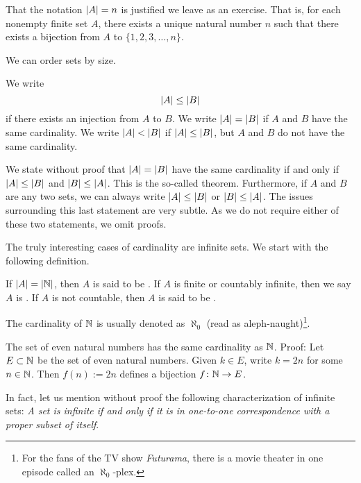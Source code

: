 That the notation $\left\lvert {A} \right\rvert = n$ is justified we leave as an exercise.  That
is, for each nonempty finite set $A$, there exists a unique natural number
$n$ such that there exists a bijection from $A$ to $\{ 1,2,3,\ldots,n \}$.


We can order sets by size.

\begin{defn} \label{def:comparecards}
We write
\begin{equation*}
\left\lvert {A} \right\rvert \leq \left\lvert {B} \right\rvert
\end{equation*}
if there exists an injection from $A$ to $B$.  We write $\left\lvert {A} \right\rvert = \left\lvert {B} \right\rvert$
if $A$ and $B$ have the same cardinality.  We write $\left\lvert {A} \right\rvert < \left\lvert {B} \right\rvert$
if $\left\lvert {A} \right\rvert \leq \left\lvert {B} \right\rvert$, but $A$ and $B$ do not have the same cardinality.
\end{defn}

We state without proof that
$\left\lvert {A} \right\rvert = \left\lvert {B} \right\rvert$ have the same cardinality if and only if
$\left\lvert {A} \right\rvert \leq \left\lvert {B} \right\rvert$ and
$\left\lvert {B} \right\rvert \leq \left\lvert {A} \right\rvert$.  This is the so-called
 theorem.
Furthermore, if $A$ and $B$ are any two sets,
we can always write $\left\lvert {A} \right\rvert \leq \left\lvert {B} \right\rvert$ or
$\left\lvert {B} \right\rvert \leq \left\lvert {A} \right\rvert$.  The issues surrounding this
last statement are very subtle.  As we do not require either
of these two statements, we omit proofs.

The truly interesting cases of cardinality are infinite sets.  We start with the following
definition.

\begin{defn}
If $\left\lvert {A} \right\rvert = \left\lvert {{\mathbb{N}}} \right\rvert$, then $A$ is said to be
\emph{}.
If $A$ is finite or countably infinite, then we say $A$
is \emph{}.
If $A$ is not countable, then
$A$ is said to be \emph{}.
\end{defn}

The cardinality of ${\mathbb{N}}$ is usually denoted as
$\aleph_0$ (read as aleph-naught)\footnote{For the fans of the TV show
\emph{Futurama}, there is a movie theater in one episode
called an $\aleph_0$-plex.}.

\begin{example}
The set of even natural numbers has the same cardinality as ${\mathbb{N}}$.  Proof:
Let $E \subset {\mathbb{N}}$ be the set of even natural numbers.
Given $k \in E$, write $k=2n$ for some $n \in {\mathbb{N}}$.
Then $f(n) := 2n$ defines a bijection $f \colon {\mathbb{N}} \to E$.
\end{example}

In fact, let us mention without proof the following characterization
of infinite sets: \emph{A set is infinite if and only if it is in one-to-one
correspondence with a proper subset of itself}.


